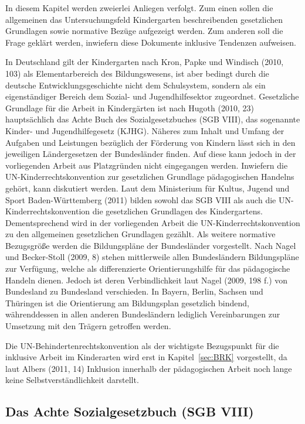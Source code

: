 In diesem Kapitel werden zweierlei Anliegen verfolgt. Zum einen sollen die allgemeinen das Untersuchungsfeld Kindergarten beschreibenden gesetzlichen Grundlagen sowie normative Bezüge aufgezeigt werden. Zum anderen soll die Frage geklärt werden, inwiefern diese Dokumente inklusive Tendenzen aufweisen. 

In Deutschland gilt der Kindergarten nach Kron, Papke und Windisch (2010, 103) als Elementarbereich des Bildungswesens, ist aber bedingt durch die deutsche Entwicklungsgeschichte nicht dem Schulsystem, sondern als ein eigenständiger Bereich dem Sozial- und Jugendhilfesektor zugeordnet. 
Gesetzliche Grundlage für die Arbeit in Kindergärten ist nach Hugoth (2010, 23) hauptsächlich das Achte Buch des Sozialgesetzbuches (SGB VIII), das sogenannte Kinder- und Jugendhilfegesetz (KJHG). Näheres zum Inhalt und Umfang der Aufgaben und Leistungen bezüglich der Förderung von Kindern lässt sich in den jeweiligen Ländergesetzen der Bundesländer finden. Auf diese kann jedoch in der vorliegenden Arbeit aus Platzgründen nicht eingegangen werden. 
Inwiefern die UN-Kinderrechtskonvention zur gesetzlichen Grundlage pädagogischen Handelns gehört, kann diskutiert werden. Laut dem Ministerium für Kultus, Jugend und Sport Baden-Württemberg (2011) bilden sowohl das SGB VIII als auch die UN-Kinderrechtskonvention die gesetzlichen Grundlagen des Kindergartens. Dementsprechend wird in der vorliegenden Arbeit die UN-Kinderrechtskonvention zu den allgemeinen gesetzlichen Grundlagen gezählt. 
Als weitere normative Bezugsgröße werden die Bildungspläne der Bundesländer vorgestellt. Nach Nagel und Becker-Stoll (2009, 8) stehen  mittlerweile allen Bundesländern Bildungspläne zur Verfügung, welche als differenzierte Orientierungshilfe für das pädagogische Handeln dienen. Jedoch ist deren Verbindlichkeit laut Nagel (2009, 198 f.) von Bundesland zu Bundesland verschieden. In Bayern, Berlin, Sachsen und Thüringen ist die Orientierung am Bildungsplan gesetzlich bindend, währenddessen in allen anderen Bundesländern lediglich Vereinbarungen zur Umsetzung mit den Trägern getroffen werden.
 
Die UN-Behindertenrechtskonvention als der wichtigste Bezugspunkt für die inklusive Arbeit im Kinderarten wird erst in Kapitel~\ref{sec:BRK} vorgestellt, da laut Albers (2011, 14) Inklusion innerhalb der pädagogischen Arbeit noch lange keine Selbstverständlichkeit darstellt.  

\subsection{Das Achte Sozialgesetzbuch (SGB VIII)}\label{kap:AchtesSGB}

